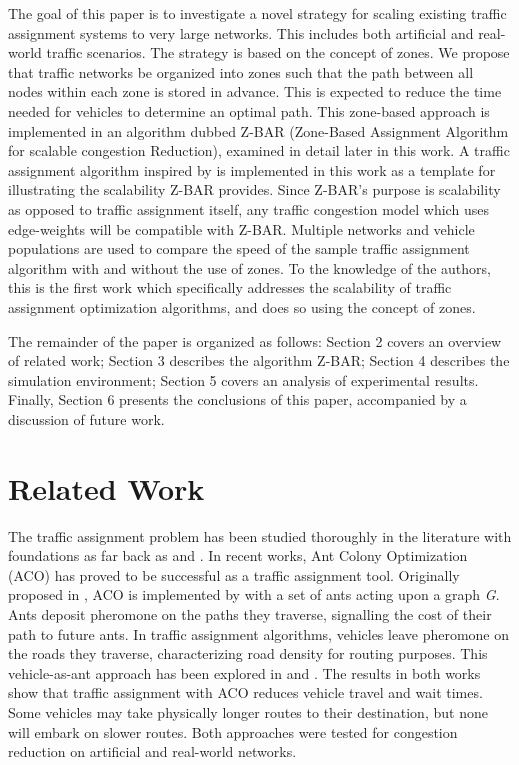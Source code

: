 \documentclass[12pt,conference]{IEEEtran}
\begin{document}
The goal of this paper is to investigate a novel strategy for scaling existing traffic assignment systems to very large networks. This includes both artificial and real-world traffic scenarios. The strategy is based on the concept of zones. We propose that traffic networks be organized into zones such that the path between all nodes within each zone is stored in advance. This is expected to reduce the time needed for vehicles to determine an optimal path. This zone-based approach is implemented in an algorithm dubbed Z-BAR (Zone-Based Assignment Algorithm for scalable congestion Reduction), examined in detail later in this work. A traffic assignment algorithm inspired by \cite{iaco} is implemented in this work as a template for illustrating the scalability Z-BAR provides. Since Z-BAR's purpose is scalability as opposed to traffic assignment itself, any traffic congestion model which uses edge-weights will be compatible with Z-BAR. Multiple networks and vehicle populations are used to compare the speed of the sample traffic assignment algorithm with and without the use of zones. To the knowledge of the authors, this is the first work which specifically addresses the scalability of traffic assignment optimization algorithms, and does so using the concept of zones.

The remainder of the paper is organized as follows: Section 2 covers an overview of related work; Section 3 describes the algorithm Z-BAR; Section 4 describes the simulation environment; Section 5 covers an analysis of experimental results. Finally, Section 6 presents the conclusions of this paper, accompanied by a discussion of future work.

\section{Related Work}

The traffic assignment problem has been studied thoroughly in the literature with foundations as far back as \cite{knight} and \cite{wardrop}. In recent works, Ant Colony Optimization (ACO) has proved to be successful as a traffic assignment tool. Originally proposed in \cite{dorigo}, ACO is implemented by with a set of ants acting upon a graph \textit{G}. Ants deposit pheromone on the paths they traverse, signalling the cost of their path to future ants. In traffic assignment algorithms, vehicles leave pheromone on the roads they traverse, characterizing road density for routing purposes. This vehicle-as-ant approach has been explored in \cite{iaco} and \cite{dtpos}. The results in both works show that traffic assignment with ACO reduces vehicle travel and wait times. Some vehicles may take physically longer routes to their destination, but none will embark on slower routes. Both approaches were tested for congestion reduction on artificial and real-world networks.
\end{document}
